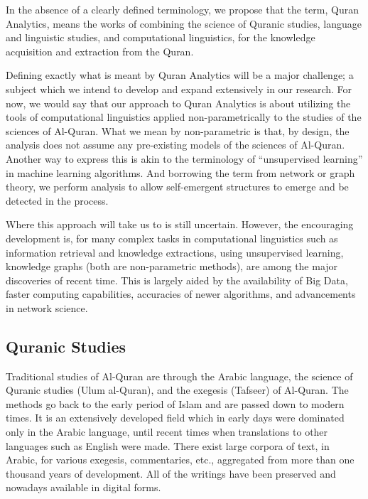 \documentclass[
]{article}
\begin{document}
In the absence of a clearly defined terminology, we propose that the term, Quran Analytics, means the works of combining the science of Quranic studies, language and linguistic studies, and computational linguistics, for the knowledge acquisition and extraction from the Quran.

Defining exactly what is meant by Quran Analytics will be a major challenge; a subject which we intend to develop and expand extensively in our research. For now, we would say that our approach to Quran Analytics is about utilizing the tools of computational linguistics applied non-parametrically to the studies of the sciences of Al-Quran. What we mean by non-parametric is that, by design, the analysis does not assume any pre-existing models of the sciences of Al-Quran. Another way to express this is akin to the terminology of ``unsupervised learning'' in machine learning algorithms. And borrowing the term from network or graph theory, we perform analysis to allow self-emergent structures to emerge and be detected in the process.

Where this approach will take us to is still uncertain. However, the encouraging development is, for many complex tasks in computational linguistics such as information retrieval and knowledge extractions, using unsupervised learning, knowledge graphs (both are non-parametric methods), are among the major discoveries of recent time. This is largely aided by the availability of Big Data, faster computing capabilities, accuracies of newer algorithms, and advancements in network science.

\hypertarget{quranic-studies}{%
\subsection{Quranic Studies}\label{quranic-studies}}

Traditional studies of Al-Quran are through the Arabic language, the science of Quranic studies (Ulum al-Quran), and the exegesis (Tafseer) of Al-Quran. The methods go back to the early period of Islam and are passed down to modern times. It is an extensively developed field which in early days were dominated only in the Arabic language, until recent times when translations to other languages such as English were made. There exist large corpora of text, in Arabic, for various exegesis, commentaries, etc., aggregated from more than one thousand years of development. All of the writings have been preserved and nowadays available in digital forms.
\end{document}
